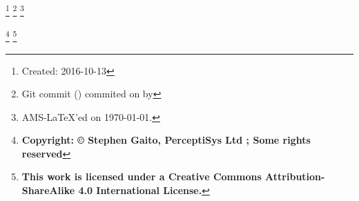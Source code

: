 \author{Stephen Gaito}
\address{PerceptiSys Ltd, 21 Gregory Ave, Coventry, CV3 6DJ, United Kingdom}%
%


\thanks{Created: 2016-10-13}
\thanks{Git commit \gitReferences{} (\gitAbbrevHash{}) commited on \gitAuthorDate{} by \gitAuthorName{}}
\thanks{AMS-\LaTeX{}'ed on \today{}.}

\thanks{\textbf{Copyright: \copyright{} Stephen Gaito, PerceptiSys Ltd \the\year{}; Some rights reserved}}
\thanks{\textbf{This work is licensed under a Creative Commons Attribution-ShareAlike 4.0 International License.}}
